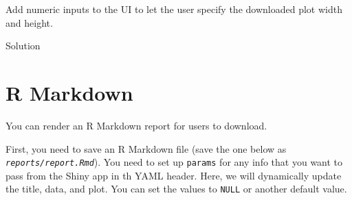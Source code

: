 \documentclass[
  oneside]{book}
\newenvironment{Shaded}{\begin{snugshade}}{\end{snugshade}}
\newcommand{\AttributeTok}[1]{\textcolor[rgb]{0.77,0.63,0.00}{#1}}
\newcommand{\CommentTok}[1]{\textcolor[rgb]{0.56,0.35,0.01}{\textit{#1}}}
\newcommand{\ControlFlowTok}[1]{\textcolor[rgb]{0.13,0.29,0.53}{\textbf{#1}}}
\newcommand{\DecValTok}[1]{\textcolor[rgb]{0.00,0.00,0.81}{#1}}
\newcommand{\DocumentationTok}[1]{\textcolor[rgb]{0.56,0.35,0.01}{\textbf{\textit{#1}}}}
\newcommand{\FunctionTok}[1]{\textcolor[rgb]{0.00,0.00,0.00}{#1}}
\newcommand{\NormalTok}[1]{#1}
\newcommand{\OtherTok}[1]{\textcolor[rgb]{0.56,0.35,0.01}{#1}}
\newcommand{\SpecialCharTok}[1]{\textcolor[rgb]{0.00,0.00,0.00}{#1}}
\newcommand{\StringTok}[1]{\textcolor[rgb]{0.31,0.60,0.02}{#1}}
\begin{document}
\begin{try}

Add numeric inputs to the UI to let the user specify the downloaded plot \AttributeTok{width} and \AttributeTok{height}.

Solution

\begin{Shaded}
\end{Shaded}

\end{try}

\hypertarget{r-markdown}{%
\section{R Markdown}\label{r-markdown}}

You can render an R Markdown report for users to download.

First, you need to save an R Markdown file (save the one below as \textit{\texttt{reports/report.Rmd}}). You need to set up \texttt{params} for any info that you want to pass from the Shiny app in th YAML header. Here, we will dynamically update the title, data, and plot. You can set the values to \texttt{NULL} or another default value.
\end{document}
